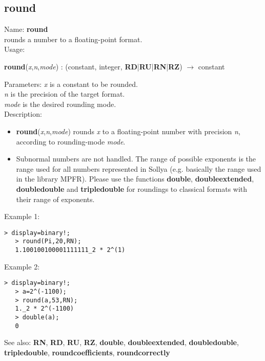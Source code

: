 \subsection{ round }
\noindent Name: \textbf{round}\\
rounds a number to a floating-point format.\\

\noindent Usage: 
\begin{center}
\textbf{round}(\emph{x},\emph{n},\emph{mode}) : (\textsf{constant}, \textsf{integer}, \textbf{RD}|\textbf{RU}|\textbf{RN}|\textbf{RZ}) $\rightarrow$ \textsf{constant}\\
\end{center}
Parameters: 
\emph{x} is a constant to be rounded.\\
\emph{n} is the precision of the target format.\\
\emph{mode} is the desired rounding mode.\\

\noindent Description: \begin{itemize}

\item \textbf{round}(\emph{x},\emph{n},\emph{mode}) rounds \emph{x} to a floating-point number with 
   precision \emph{n}, according to rounding-mode \emph{mode}. 

\item Subnormal numbers are not handled. The range of possible exponents is the 
   range used for all numbers represented in Sollya (e.g. basically the range 
   used in the library MPFR). Please use the functions \textbf{double}, \textbf{doubleextended},
   \textbf{doubledouble} and \textbf{tripledouble} for roundings to classical formats with their
   range of exponents.
\end{itemize}
\noindent Example 1: 
\begin{center}\begin{minipage}{14.8cm}\begin{Verbatim}[frame=single]
   > display=binary!;
   > round(Pi,20,RN);
   1.100100100001111111_2 * 2^(1)
\end{Verbatim}
\end{minipage}\end{center}
\noindent Example 2: 
\begin{center}\begin{minipage}{14.8cm}\begin{Verbatim}[frame=single]
   > display=binary!;
   > a=2^(-1100);
   > round(a,53,RN);
   1._2 * 2^(-1100)
   > double(a);
   0
\end{Verbatim}
\end{minipage}\end{center}
See also: \textbf{RN}, \textbf{RD}, \textbf{RU}, \textbf{RZ}, \textbf{double}, \textbf{doubleextended}, \textbf{doubledouble}, \textbf{tripledouble}, \textbf{roundcoefficients}, \textbf{roundcorrectly}
